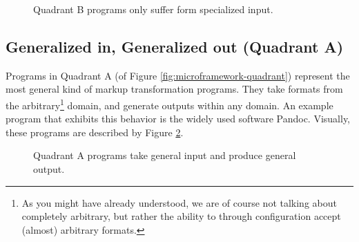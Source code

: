 \documentclass{scrreprt}
\begin{document}
\begin{figure}[h]
  \centering


  \caption{Quadrant B programs only suffer form specialized input.}
  \label{fig:workflows-framework-spec-in-gen-out}
\end{figure}



\subsection{Generalized in, Generalized out (Quadrant A)}
Programs in Quadrant A (of Figure \ref{fig:microframework-quadrant}) represent the most general kind of markup transformation programs. They take formats from the arbitrary\footnote{As you might have already understood, we are of course not talking about completely arbitrary, but rather the ability to through configuration accept (almost) arbitrary formats.} domain, and generate outputs within any domain. An example program that exhibits this behavior is the widely used software Pandoc. Visually, these programs are described by Figure \ref{fig:workflows-framework-gen-in-gen-out}.

\begin{figure}[h]
  \centering


  \caption{Quadrant A programs take general input and produce general output.}
  \label{fig:workflows-framework-gen-in-gen-out}
\end{figure}
\end{document}

